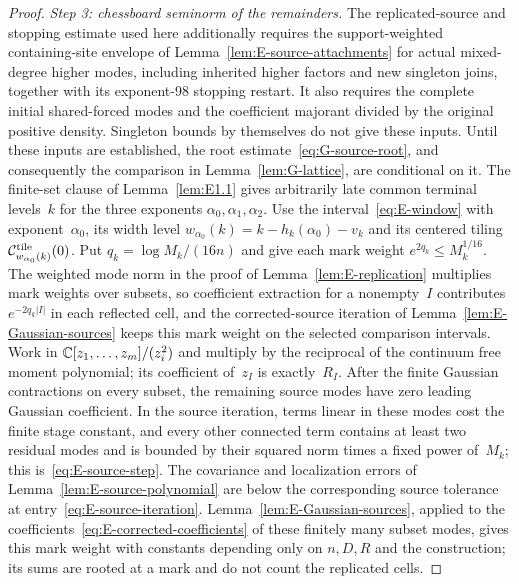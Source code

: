 \begin{proof}
\emph{Step 3: chessboard seminorm of the remainders.} The replicated-source and stopping estimate used here additionally requires the support-weighted containing-site envelope of Lemma~\ref{lem:E-source-attachments} for actual mixed-degree higher modes, including inherited higher factors and new singleton joins, together with its exponent-98 stopping restart. It also requires the complete initial shared-forced modes and the coefficient majorant divided by the original positive density. Singleton bounds by themselves do not give these inputs. Until these inputs are established, the root estimate~\eqref{eq:G-source-root}, and consequently the comparison in Lemma~\ref{lem:G-lattice}, are conditional on it. The finite-set clause of Lemma~\ref{lem:E1.1} gives arbitrarily late common terminal levels~$k$ for the three exponents $\alpha_0,\alpha_1,\alpha_2$. Use the interval~\eqref{eq:E-window} with exponent~$\alpha_0$, its width level $w_{\alpha_0}(k)=k-h_k(\alpha_0)-v_k$ and its centered tiling $\mathcal C^{\rm tile}_{w_{\alpha_0}(k)}(0)$. Put $q_k=\log M_k/(16n)$ and give each mark weight $e^{2q_k}\le M_k^{1/16}$. The weighted mode norm in the proof of Lemma~\ref{lem:E-replication} multiplies mark weights over subsets, so coefficient extraction for a nonempty~$I$ contributes $e^{-2q_k|I|}$ in each reflected cell, and the corrected-source iteration of Lemma~\ref{lem:E-Gaussian-sources} keeps this mark weight on the selected comparison intervals. Work in $\mathbb{C}[z_1,\ldots,z_m]/(z_i^2)$ and multiply by the reciprocal of the continuum free moment polynomial; its coefficient of~$z_I$ is exactly~$R_I$. After the finite Gaussian contractions on every subset, the remaining source modes have zero leading Gaussian coefficient. In the source iteration, terms linear in these modes cost the finite stage constant, and every other connected term contains at least two residual modes and is bounded by their squared norm times a fixed power of~$M_k$; this is~\eqref{eq:E-source-step}. The covariance and localization errors of Lemma~\ref{lem:E-source-polynomial} are below the corresponding source tolerance at entry~\eqref{eq:E-source-iteration}. Lemma~\ref{lem:E-Gaussian-sources}, applied to the coefficients~\eqref{eq:E-corrected-coefficients} of these finitely many subset modes, gives this mark weight with constants depending only on $n,D,R$ and the construction; its sums are rooted at a mark and do not count the replicated cells.


\end{proof}
